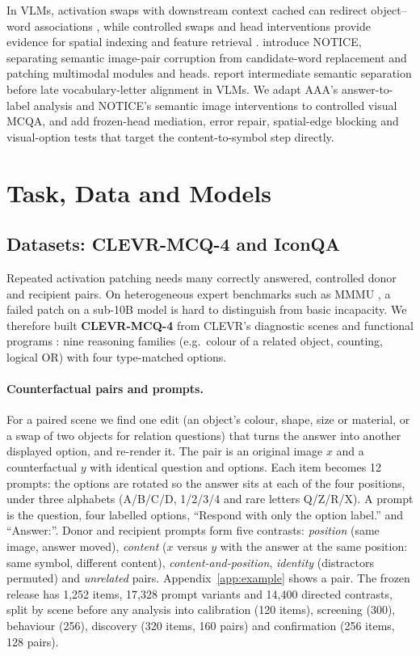 \documentclass[11pt]{article}
\begin{document}
In VLMs, activation swaps with downstream context cached can redirect object--word associations \citep{saravanan2025binding}, while controlled swaps and head interventions provide evidence for spatial indexing and feature retrieval \citep{assouel2026visualsymbolic}. \citet{golovanevsky2025notice} introduce NOTICE, separating semantic image-pair corruption from candidate-word replacement and patching multimodal modules and heads. \citet{palacios2026abstraction} report intermediate semantic separation before late vocabulary-letter alignment in VLMs. We adapt AAA's answer-to-label analysis and NOTICE's semantic image interventions to controlled visual MCQA, and add frozen-head mediation, error repair, spatial-edge blocking and visual-option tests that target the content-to-symbol step directly.

\section{Task, Data and Models}

\subsection{Datasets: CLEVR-MCQ-4 and IconQA}

Repeated activation patching needs many correctly answered, controlled donor and recipient pairs. On heterogeneous expert benchmarks such as MMMU \citep{yue2024mmmu}, a failed patch on a sub-10B model is hard to distinguish from basic incapacity. We therefore built \textbf{CLEVR-MCQ-4} from CLEVR's diagnostic scenes and functional programs \citep{Johnson_2017_CVPR}: nine reasoning families (e.g.\ colour of a related object, counting, logical OR) with four type-matched options.

\paragraph{Counterfactual pairs and prompts.} For a paired scene we find one edit (an object's colour, shape, size or material, or a swap of two objects for relation questions) that turns the answer into another displayed option, and re-render it. The pair is an original image $x$ and a counterfactual $y$ with identical question and options. Each item becomes 12 prompts: the options are rotated so the answer sits at each of the four positions, under three alphabets (A/B/C/D, 1/2/3/4 and rare letters Q/Z/R/X). A prompt is the question, four labelled options, ``Respond with only the option label.'' and ``Answer:''. Donor and recipient prompts form five contrasts: \emph{position} (same image, answer moved), \emph{content} ($x$ versus $y$ with the answer at the same position: same symbol, different content), \emph{content-and-position}, \emph{identity} (distractors permuted) and \emph{unrelated} pairs. Appendix~\ref{app:example} shows a pair. The frozen release has 1,252 items, 17,328 prompt variants and 14,400 directed contrasts, split by scene before any analysis into calibration (120 items), screening (300), behaviour (256), discovery (320 items, 160 pairs) and confirmation (256 items, 128 pairs).
\end{document}
